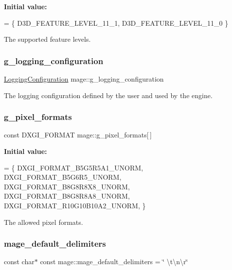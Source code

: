 {\bfseries Initial value\+:}
\begin{DoxyCode}
= \{
        D3D\_FEATURE\_LEVEL\_11\_1,
        D3D\_FEATURE\_LEVEL\_11\_0
    \}
\end{DoxyCode}
The supported feature levels. \hypertarget{namespacemage_a162413669f92d91c7ee135d60f93fcf1}{}\label{namespacemage_a162413669f92d91c7ee135d60f93fcf1} 
\subsubsection{\texorpdfstring{g\+\_\+logging\+\_\+configuration}{g\_logging\_configuration}}
{\footnotesize\ttfamily \hyperlink{structmage_1_1_logging_configuration}{Logging\+Configuration} mage\+::g\+\_\+logging\+\_\+configuration}

The logging configuration defined by the user and used by the engine. \hypertarget{namespacemage_a5a4e11b65061c618b85826ab6df480e0}{}\label{namespacemage_a5a4e11b65061c618b85826ab6df480e0} 
\subsubsection{\texorpdfstring{g\+\_\+pixel\+\_\+formats}{g\_pixel\_formats}}
{\footnotesize\ttfamily const D\+X\+G\+I\+\_\+\+F\+O\+R\+M\+AT mage\+::g\+\_\+pixel\+\_\+formats\mbox{[}$\,$\mbox{]}}

{\bfseries Initial value\+:}
\begin{DoxyCode}
= \{
        DXGI\_FORMAT\_B5G5R5A1\_UNORM,    
        DXGI\_FORMAT\_B5G6R5\_UNORM,      
        DXGI\_FORMAT\_B8G8R8X8\_UNORM,    
        DXGI\_FORMAT\_B8G8R8A8\_UNORM,    
        DXGI\_FORMAT\_R10G10B10A2\_UNORM, 
    \}
\end{DoxyCode}
The allowed pixel formats. \hypertarget{namespacemage_ae247ad66af37a4b0d67ddca9404ca01a}{}\label{namespacemage_ae247ad66af37a4b0d67ddca9404ca01a} 
\subsubsection{\texorpdfstring{mage\+\_\+default\+\_\+delimiters}{mage\_default\_delimiters}}
{\footnotesize\ttfamily const char$\ast$ const mage\+::mage\+\_\+default\+\_\+delimiters = \char`\"{} \textbackslash{}t\textbackslash{}n\textbackslash{}r\char`\"{}}

